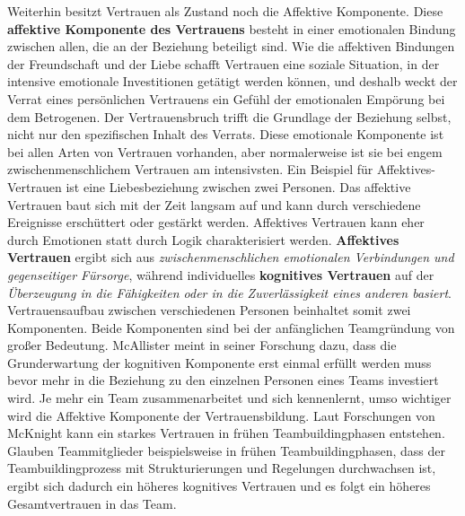 \documentclass[a4paper,11pt]{article}%
\renewcommand{\\}{\vspace*{0.5\baselineskip} \newline}
\begin{document}
Weiterhin besitzt Vertrauen als \dq Zustand\dq{} noch die Affektive Komponente.\\ \dq Diese \textbf{affektive Komponente des Vertrauens} besteht in einer emotionalen Bindung zwischen allen, die an der Beziehung beteiligt sind. Wie die affektiven Bindungen der Freundschaft und der Liebe schafft Vertrauen eine soziale Situation, in der intensive emotionale Investitionen getätigt werden können, und deshalb weckt der Verrat eines persönlichen Vertrauens ein Gefühl der emotionalen Empörung bei dem Betrogenen. Der Vertrauensbruch trifft die Grundlage der Beziehung selbst, nicht nur den spezifischen Inhalt des Verrats. Diese emotionale Komponente ist bei allen Arten von Vertrauen vorhanden, aber normalerweise ist sie bei engem zwischenmenschlichem Vertrauen am intensivsten.\dq{} \citep[p.971]{lewis1985trust} 
\\
Ein Beispiel für Affektives-Vertrauen ist eine Liebesbeziehung zwischen zwei Personen. Das affektive Vertrauen baut sich mit der Zeit langsam auf und kann durch verschiedene Ereignisse erschüttert oder gestärkt werden. Affektives Vertrauen kann eher durch Emotionen statt durch Logik charakterisiert werden.
\textbf{Affektives Vertrauen} ergibt sich aus \textit{zwischenmenschlichen emotionalen Verbindungen und gegenseitiger Fürsorge}, während individuelles \textbf{kognitives Vertrauen} auf der \textit{Überzeugung in die Fähigkeiten oder in die Zuverlässigkeit eines anderen basiert}. 
\\
Vertrauensaufbau zwischen verschiedenen Personen beinhaltet somit zwei Komponenten. Beide Komponenten sind bei der anfänglichen Teamgründung von großer Bedeutung. 
McAllister meint in seiner Forschung dazu, dass die Grunderwartung der kognitiven Komponente erst einmal erfüllt werden muss bevor mehr in die Beziehung zu den einzelnen Personen eines Teams investiert wird. Je mehr ein Team zusammenarbeitet und sich kennenlernt, umso wichtiger wird die Affektive Komponente der Vertrauensbildung. \citep[p.30]{mcallister1995affect}\\
Laut Forschungen von McKnight kann ein starkes Vertrauen in frühen Teambuildingphasen entstehen. Glauben Teammitglieder beispielsweise in frühen Teambuildingphasen, dass der Teambuildingprozess mit Strukturierungen und Regelungen durchwachsen ist, ergibt sich dadurch ein höheres kognitives Vertrauen und es folgt ein höheres Gesamtvertrauen in das Team. \citep[p.478-479]{mcknight1998initial}
\end{document}
